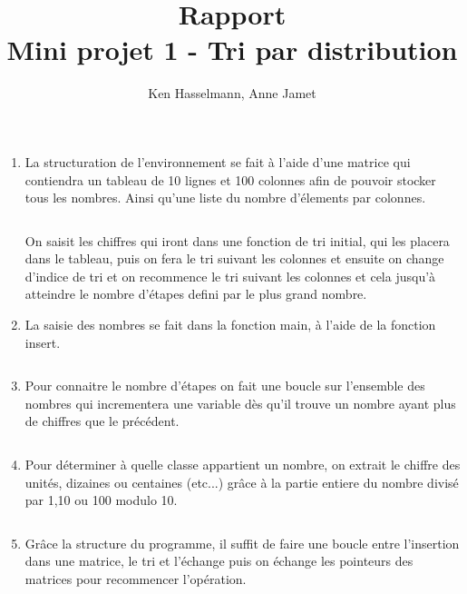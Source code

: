 \documentclass[a4paper]{article}
\author{Ken Hasselmann, Anne Jamet}
\title{Rapport \\ Mini projet 1 - Tri par distribution}
\begin{document}
\maketitle
\thispagestyle{fancy}
\renewcommand{\headrulewidth}{0pt} %

\begin{enumerate}
\item{La structuration de l'environnement se fait à l'aide d'une matrice qui contiendra un tableau de 10 lignes et 100 colonnes afin de pouvoir stocker tous les nombres. Ainsi qu'une liste du nombre d'élements par colonnes.}

\inputminted[linenos,firstline=1,firstnumber=1,lastline = 14]{cpp}{sp/main.h}

On saisit les chiffres qui iront dans une fonction de tri initial, qui les placera dans le tableau, puis on fera le tri suivant les colonnes et ensuite on change d'indice de tri et on recommence le tri suivant les colonnes et cela jusqu'à atteindre le nombre d'étapes defini par le plus grand nombre.
\\

\item{La saisie des nombres se fait dans la fonction main, à l'aide de la fonction insert.}

\inputminted[linenos,firstline=16,firstnumber=16,lastline = 22]{cpp}{sp/main.2.cpp}
\clearpage
\item{Pour connaitre le nombre d'étapes on fait une boucle sur l'ensemble des nombres qui incrementera une variable dès qu'il trouve un nombre ayant plus de chiffres que le précédent.}

\inputminted[linenos,firstline=24,firstnumber=24,lastline = 24]{cpp}{sp/main.2.cpp}

\item{Pour déterminer à quelle classe appartient un nombre, on extrait le chiffre des unités, dizaines ou centaines (etc...) grâce à la partie entiere du nombre divisé par 1,10 ou 100 modulo 10.}

\inputminted[linenos,firstline=68,firstnumber=68,lastline = 74]{cpp}{sp/main.2.cpp}

\item{Grâce la structure du programme, il suffit de faire une boucle entre l'insertion dans une matrice, le tri et l'échange puis on échange les pointeurs des matrices pour recommencer l'opération.}
\inputminted[linenos,firstline=30,firstnumber=30,lastline = 44]{cpp}{sp/main.2.cpp}

\end{enumerate}
\end{document}
